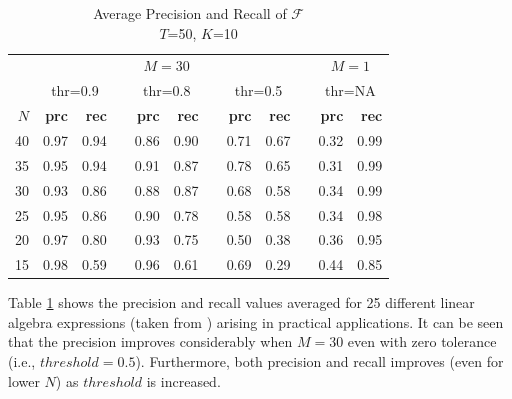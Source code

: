 \documentclass[conference]{IEEEtran}
\begin{document}
\begin{table}[h!]
	\begin{center}
		\renewcommand{\arraystretch}{1.2}
		\begin{tabular}{@{}r rr c rr c rr c rr@{}}
			\toprule
			& \multicolumn{8}{c}{$M=30$} & & \multicolumn{2}{c}{$M=1$} \\
			\cmidrule{2-9} \cmidrule{11-12}
			& \multicolumn{2}{c}{thr=0.9} & & \multicolumn{2}{c}{thr=0.8} & & \multicolumn{2}{c}{thr=0.5} & & \multicolumn{2}{c}{thr=NA} \\
			\cmidrule{2-3} \cmidrule{5-6} \cmidrule{8-9} \cmidrule{11-12}
			{$N$} & \textbf{prc} & \textbf{rec} && \textbf{prc} & \textbf{rec} && \textbf{prc} & \textbf{rec} && \textbf{prc} & \textbf{rec} \\
			\midrule
			{40} & 0.97  & 0.94  && 0.86  & 0.90  && 0.71  & 0.67 && 0.32 & 0.99 \\
			{35} & 0.95  & 0.94  && 0.91  & 0.87  && 0.78  & 0.65 && 0.31 & 0.99 \\
			{30} & 0.93  & 0.86  && 0.88  & 0.87  && 0.68  & 0.58 && 0.34 & 0.99 \\
			{25} & 0.95  & 0.86  && 0.90  & 0.78  && 0.58  & 0.58 && 0.34 & 0.98 \\
			{20} & 0.97  & 0.80  && 0.93  & 0.75  && 0.50  & 0.38 && 0.36 & 0.95 \\
			{15} & 0.98  & 0.59  && 0.96  & 0.61  && 0.69  & 0.29 && 0.44 & 0.85 \\
			\bottomrule
		\end{tabular}
		\caption{Average Precision and Recall of $\mathcal{F}$  \\ $T$=50, $K$=10}
		\label{tab:3}
	\end{center}
\end{table}
 Table \ref{tab:3} shows the precision and recall values averaged for 25 different linear algebra expressions (taken from \cite{barthels2019linnea}) arising in practical applications.  It can be seen that the precision improves considerably when $M=30$ even with zero tolerance (i.e., $threshold = 0.5$). Furthermore, both precision and recall improves (even for lower $N$) as $threshold$ is increased.
 
\end{document}
